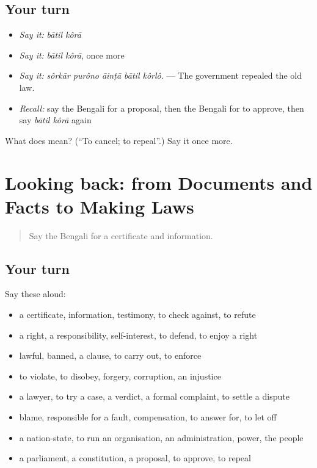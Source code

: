 \subsection*{Your turn}
\begin{itemize}
\raggedright
  \item \emph{Say it:} \emph{bātil kôrā}
  \item \emph{Say it:} \emph{bātil kôrā}, once more
  \item \emph{Say it:} \emph{sôrkār purôno āinṭā bātil kôrlô.} — The government repealed the old law.
  \item \emph{Recall:} say the Bengali for a proposal, then the Bengali for to approve, then say \emph{bātil kôrā} again
\end{itemize}

\begin{tcolorbox}[breakable,colback=teal!4,colframe=teal!35!black,title={Before you move on}]
What does   mean? (\textquotedblleft{}To cancel; to repeal\textquotedblright{}.) Say it once more.
\end{tcolorbox}
\section[(dialogue)]{Looking back: from Documents and Facts to Making Laws}

\label{lesson:BN-R345-review-338-345}



\begin{quote}
Say the Bengali for a certificate and information.
\end{quote}

\subsection*{Your turn}
Say these aloud:

\begin{itemize}
\raggedright
  \item a certificate, information, testimony, to check against, to refute
  \item a right, a responsibility, self-interest, to defend, to enjoy a right
  \item lawful, banned, a clause, to carry out, to enforce
  \item to violate, to disobey, forgery, corruption, an injustice
  \item a lawyer, to try a case, a verdict, a formal complaint, to settle a dispute
  \item blame, responsible for a fault, compensation, to answer for, to let off
  \item a nation-state, to run an organisation, an administration, power, the people
  \item a parliament, a constitution, a proposal, to approve, to repeal
\end{itemize}

